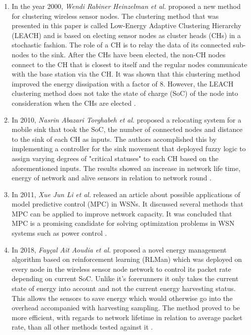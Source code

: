 \begin{enumerate}
    \item In the year 2000, \textit{Wendi Rabiner Heinzelman et al.} proposed a new method for clustering wireless sensor nodes. The clustering method that was presented in this paper is called Low-Energy Adaptive Clustering Hierarchy (LEACH) and is based on electing sensor nodes as cluster heads (CHs) in a stochastic fashion. The role of a CH is to relay the data of its connected sub-nodes to the sink. After the CHs have been elected, the non-CH nodes connect to the CH that is closest to itself and the regular nodes communicate with the base station via the CH. It was shown that this clustering method improved the energy dissipation with a factor of 8. However, the LEACH clustering method does not take the state of charge (SoC) of the node into consideration when the CHs are elected \cite{heinzelman2000energy}.

    \item In 2010, \textit{Nasrin Abazari Torghabeh et al.} proposed a relocating system for a mobile sink that took the SoC, the number of connected nodes and distance to the sink of each CH as inputs. The authors accomplished this by implementing a controller for the sink movement that deployed fuzzy logic to assign varying degrees of "critical statuses" to each CH based on the aforementioned inputs. The results showed an increase in network life time, energy of network and alive sensors in relation to network round \cite{torghabeh2010mobile}.
    
    \item In 2011, \textit{Xue Jun Li et al.} released an article about possible applications of model predictive control (MPC) in WSNs. It discussed several methods that MPC can be applied to improve network capacity. It was concluded that MPC is a promising candidate for solving optimization problems in WSN systems such as power control \cite{li2011application}.
 
    \item In 2018, \textit{Fayçal Ait Aoudia et al.} proposed a novel energy management algorithm based on reinforcement learning (RLMan) which was deployed on every node in the wireless sensor node network to control its packet rate depending on current SoC. Unlike it's forerunners it only takes the current state of energy into account and not the current energy harvesting status. This allows the sensors to save energy which would otherwise go into the overhead accompanied with harvesting sampling. The method proved to be more efficient, with regards to network lifetime in relation to average packet rate, than all other methods tested against it \cite{RLbasedEHWSN_RLMAN}.
\end{enumerate} 

